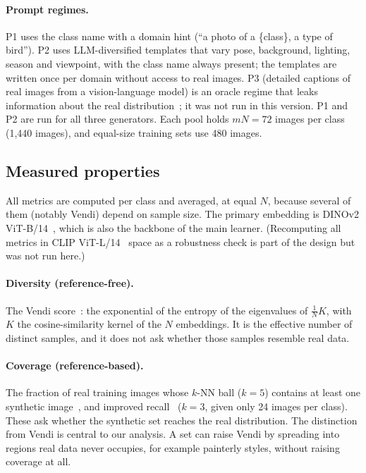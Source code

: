 \documentclass[10pt,twocolumn,letterpaper]{article}
\begin{document}
\paragraph{Prompt regimes.} P1 uses the class name with a domain hint (``a photo of a \{class\}, a type of bird''). P2 uses LLM-diversified templates that vary pose, background, lighting, season and viewpoint, with the class name always present; the templates are written once per domain without access to real images. P3 (detailed captions of real images from a vision-language model) is an oracle regime that leaks information about the real distribution~\cite{adamkiewicz2026pretty}; it was not run in this version. P1 and P2 are run for all three generators. Each pool holds $mN{=}72$ images per class (1{,}440 images), and equal-size training sets use 480 images.

\subsection{Measured properties}\label{sec:measures}
All metrics are computed per class and averaged, at equal $N$, because several of them (notably Vendi) depend on sample size. The primary embedding is DINOv2 ViT-B/14~\cite{oquab2024dinov2}, which is also the backbone of the main learner. (Recomputing all metrics in CLIP ViT-L/14~\cite{radford2021learning} space as a robustness check is part of the design but was not run here.)

\paragraph{Diversity (reference-free).} The Vendi score~\cite{friedman2023vendi}: the exponential of the entropy of the eigenvalues of $\tfrac1N K$, with $K$ the cosine-similarity kernel of the $N$ embeddings. It is the effective number of distinct samples, and it does not ask whether those samples resemble real data.

\paragraph{Coverage (reference-based).} The fraction of real training images whose $k$-NN ball ($k{=}5$) contains at least one synthetic image~\cite{naeem2020reliable}, and improved recall~\cite{kynkaanniemi2019improved} ($k{=}3$, given only 24 images per class). These ask whether the synthetic set reaches the real distribution. The distinction from Vendi is central to our analysis. A set can raise Vendi by spreading into regions real data never occupies, for example painterly styles, without raising coverage at all.
\end{document}
